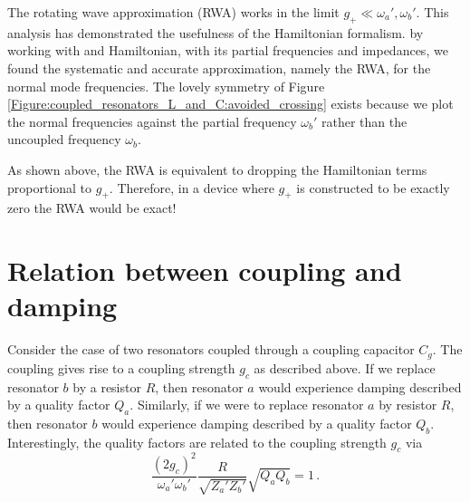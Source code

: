 \documentclass{article}
\begin{document}
The rotating wave approximation (RWA) works in the limit $g_+ \ll \omega_a', \omega_b'$.
This analysis has demonstrated the usefulness of the Hamiltonian formalism.
by working with and Hamiltonian, with its partial frequencies and impedances, we found the systematic and accurate approximation, namely the RWA, for the normal mode frequencies.
The lovely symmetry of Figure \ref{Figure:coupled_resonators_L_and_C:avoided_crossing} exists because we plot the normal frequencies against the partial frequency $\omega_b'$ rather than the uncoupled frequency $\omega_b$.

As shown above, the RWA is equivalent to dropping the Hamiltonian terms proportional to $g_+$.
Therefore, in a device where $g_+$ is constructed to be exactly zero the RWA would be exact!

\section{Relation between coupling and damping}

Consider the case of two resonators coupled through a coupling capacitor $C_g$.
The coupling gives rise to a coupling strength $g_c$ as described above.
If we replace resonator $b$ by a resistor $R$, then resonator $a$ would experience damping described by a quality factor $Q_a$.
Similarly, if we were to replace resonator $a$ by resistor $R$, then resonator $b$ would experience damping described by a quality factor $Q_b$.
Interestingly, the quality factors are related to the coupling strength $g_c$ via
\begin{equation*}
  \frac{(2 g_c)^2}{\omega_a' \omega_b'} \frac{R}{\sqrt{Z_a' Z_b'}} \sqrt{Q_a Q_b} = 1 \, .
\end{equation*}
\end{document}
